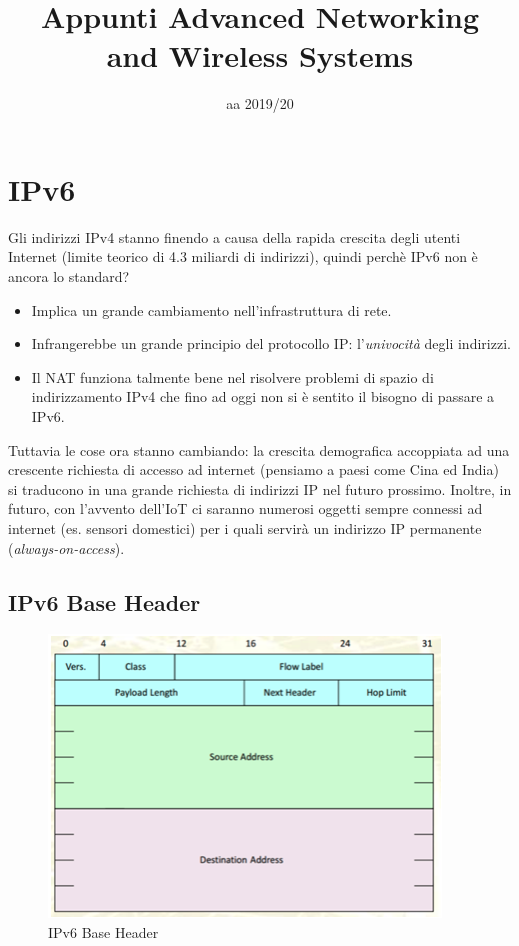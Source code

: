 \documentclass{article}
\title{Appunti Advanced Networking \\ and Wireless Systems}
\author{}
\date{aa 2019/20}
\begin{document}
\maketitle

\tableofcontents

\newpage
\section{IPv6}
Gli indirizzi IPv4 stanno finendo a causa della rapida crescita degli utenti Internet (limite teorico di 4.3 miliardi di indirizzi), quindi perchè IPv6 non è ancora lo standard?
\begin{itemize}
    \item Implica un grande cambiamento nell'infrastruttura di rete.
    \item Infrangerebbe un grande principio del protocollo IP: l'\textit{univocità} degli indirizzi.
    \item Il NAT funziona talmente bene nel risolvere problemi di spazio di indirizzamento IPv4 che fino ad oggi non si è sentito il bisogno di passare a IPv6.
\end{itemize}
Tuttavia le cose ora stanno cambiando: la crescita demografica accoppiata ad una crescente richiesta di accesso ad internet (pensiamo a paesi come Cina ed India) si traducono in una grande richiesta di indirizzi IP nel futuro prossimo.
Inoltre, in futuro, con l'avvento dell'IoT ci saranno numerosi oggetti sempre connessi ad internet (es. sensori domestici) per i quali servirà un indirizzo IP permanente (\textit{always-on-access}).

\subsection{IPv6 Base Header}
\begin{figure}[H]
\centering
\includegraphics[scale=0.5]{figures/base header.png}
\caption{IPv6 Base Header}
\end{figure}
\end{document}
